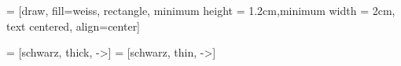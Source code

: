 


 = [draw,%
fill=weiss,%
rectangle,%
minimum height = 1.2cm,minimum width = 2cm,%
text centered,
align=center]


 = [schwarz, thick, ->]
 = [schwarz, thin, ->]


